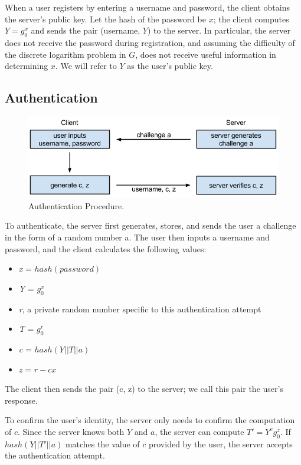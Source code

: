 \documentclass[11pt]{article}
\begin{document}
When a user registers by entering a username and password, the client obtains the server's public key.  Let the hash of the password be $x$; the client computes $Y = g_0 ^ x$ and sends the pair (username, $Y$) to the server.  In particular, the server does not receive the password during registration, and assuming the difficulty of the discrete logarithm problem in $G$, does not receive useful information in determining $x$.  We will refer to $Y$ as the user's public key.\cite{Lum}


\subsection{Authentication}
\begin{figure}[h]
  \centering
\includegraphics[scale=0.65]{auth.png}

 \caption{Authentication Procedure.}
 \label{fig:authentication}
\end{figure}

To authenticate, the server first generates, stores, and sends the user a challenge in the form of a random number a.  The user then inputs a username and password, and the client calculates the following values:
\begin{itemize}
  \item {\em x} = $hash(password)$
  \item {\em Y} = $g_0 ^ x$
  \item {\em r}, a private random number specific to this authentication attempt
  \item {\em T} = $g_0 ^ r$
  \item {\em c} = $hash(Y || T || a)$
  \item {\em z} = $r - cx$
\end{itemize}
The client then sends the pair (c, z) to the server; we call this pair the user's response.


To confirm the user's identity, the server only needs to confirm the computation of $c$.  Since the server knows both $Y$ and $a$, the server can compute $T' = Y^cg_0^z$.  If $hash(Y || T' || a)$ matches the value of $c$ provided by the user, the server accepts the authentication attempt.\cite{Lum}
\end{document}
